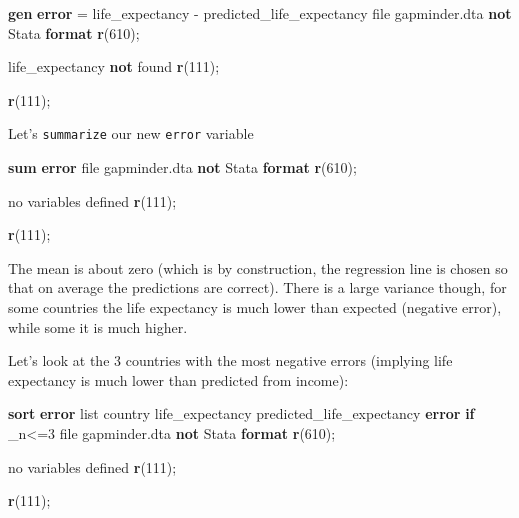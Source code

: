 \documentclass[
]{book}
\newenvironment{Shaded}{\begin{snugshade}}{\end{snugshade}}
\newcommand{\DataTypeTok}[1]{\textcolor[rgb]{0.13,0.29,0.53}{#1}}
\newcommand{\FunctionTok}[1]{\textcolor[rgb]{0.13,0.29,0.53}{\textbf{#1}}}
\newcommand{\KeywordTok}[1]{\textcolor[rgb]{0.13,0.29,0.53}{\textbf{#1}}}
\newcommand{\NormalTok}[1]{#1}
\newcommand{\OtherTok}[1]{\textcolor[rgb]{0.56,0.35,0.01}{#1}}
\begin{document}
\begin{Shaded}
\begin{Highlighting}[]
\KeywordTok{gen} \KeywordTok{error}\NormalTok{ = life\_expectancy {-} predicted\_life\_expectancy}
\NormalTok{file gapminder.dta }\KeywordTok{not}\NormalTok{ Stata }\KeywordTok{format}
\FunctionTok{r}\NormalTok{(610);}


\NormalTok{life\_expectancy }\KeywordTok{not}\NormalTok{ found}
\FunctionTok{r}\NormalTok{(111);}

\FunctionTok{r}\NormalTok{(111);}
\end{Highlighting}
\end{Shaded}

Let's \texttt{summarize} our new \texttt{error} variable

\begin{Shaded}
\begin{Highlighting}[]
\KeywordTok{sum} \KeywordTok{error}
\NormalTok{file gapminder.dta }\KeywordTok{not}\NormalTok{ Stata }\KeywordTok{format}
\FunctionTok{r}\NormalTok{(610);}


\NormalTok{no variables defined}
\FunctionTok{r}\NormalTok{(111);}

\FunctionTok{r}\NormalTok{(111);}
\end{Highlighting}
\end{Shaded}

The mean is about zero (which is by construction, the regression line is chosen so that on average the predictions are correct). There is a large variance though, for some countries the life expectancy is much lower than expected (negative error), while some it is much higher.

Let's look at the 3 countries with the most negative errors (implying life expectancy is much lower than predicted from income):

\begin{Shaded}
\begin{Highlighting}[]
\KeywordTok{sort} \KeywordTok{error}
\OtherTok{list}\NormalTok{ country life\_expectancy predicted\_life\_expectancy }\KeywordTok{error} \KeywordTok{if} \DataTypeTok{\_n}\NormalTok{\textless{}=3}
\NormalTok{file gapminder.dta }\KeywordTok{not}\NormalTok{ Stata }\KeywordTok{format}
\FunctionTok{r}\NormalTok{(610);}


\NormalTok{no variables defined}
\FunctionTok{r}\NormalTok{(111);}

\FunctionTok{r}\NormalTok{(111);}
\end{Highlighting}
\end{Shaded}
\end{document}
